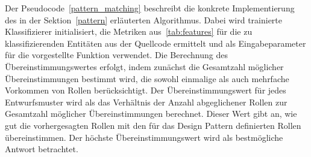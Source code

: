 Der Pseudocode~\ref{pattern_matching} beschreibt die konkrete Implementierung des in der Sektion~\ref{pattern} erläuterten Algorithmus.
Dabei wird trainierte Klassifizierer initialisiert, die Metriken aus~\ref{tab:features} für die zu klassifizierenden Entitäten aus der Quellcode ermittelt und als Eingabeparameter für die vorgestellte Funktion verwendet.
Die Berechnung des Übereinstimmungswertes erfolgt, indem zunächst die Gesamtzahl möglicher Übereinstimmungen bestimmt wird, die sowohl einmalige als auch mehrfache Vorkommen von Rollen berücksichtigt. Der Übereinstimmungswert für jedes Entwurfsmuster wird als das Verhältnis der Anzahl abgeglichener Rollen zur Gesamtzahl möglicher Übereinstimmungen berechnet. 
Dieser Wert gibt an, wie gut die vorhergesagten Rollen mit den für das Design Pattern definierten Rollen übereinstimmen. Der höchste Übereinstimmungswert wird als bestmögliche Antwort betrachtet.